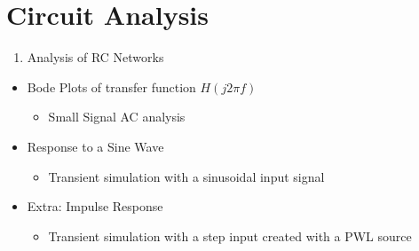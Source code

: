 \documentclass[letterpaper,10pt,english]{jupyterBook}
\begin{document}
\section{Circuit Analysis}
\label{\detokenize{TestYourKnowledge/AEC_prereq_solution/AEC_entry_test_solution:circuit-analysis}}\begin{enumerate}
%
\item {} 
\sphinxAtStartPar
Analysis of RC Networks

\end{enumerate}
\begin{itemize}
\item {} 
\sphinxAtStartPar
Bode Plots of transfer function \(H(j 2\pi f)\)
\begin{itemize}
\item {} 
\sphinxAtStartPar
Small Signal AC analysis 

\end{itemize}

\end{itemize}

\sphinxAtStartPar
{}
\begin{itemize}
\item {} 
\sphinxAtStartPar
Response to a Sine Wave
\begin{itemize}
\item {} 
\sphinxAtStartPar
Transient simulation  with a sinusoidal input signal

\end{itemize}

\end{itemize}

\sphinxAtStartPar
{}
\begin{itemize}
\item {} 
\sphinxAtStartPar
Extra: Impulse Response
\begin{itemize}
\item {} 
\sphinxAtStartPar
Transient simulation  with a step input created with a PWL source

\end{itemize}

\end{itemize}
\end{document}
